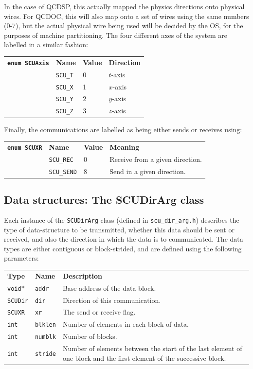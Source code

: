 \documentclass[12pt]{article}
\newcommand{\cde}[1]{{\tt #1}}            %
\begin{document}
In the case of QCDSP, this actually mapped the physics directions
onto physical wires.  For QCDOC, this will also map onto a set of
wires using the same numbers (0-7), but the actual physical wire being
used will be decided by the OS, for the purposes of machine
partitioning. The four different axes of the system are labelled in a
similar fashion:

\begin{tabular}{llll}
\cde{{\bf enum SCUAxis}} & {\bf Name} & {\bf Value} & {\bf Direction} \\
                        &\cde{SCU\_\-T} & 0 & $t$-axis\\
                        &\cde{SCU\_\-X} & 1 & $x$-axis\\
                        &\cde{SCU\_\-Y} & 2 & $y$-axis\\
                        &\cde{SCU\_\-Z} & 3 & $z$-axis
\end{tabular}

Finally, the communications are labelled as being either sends or receives using:

\begin{tabular}{llll}
\cde{{\bf enum SCUXR}} & {\bf Name} & {\bf Value} & {\bf Meaning} \\
                        &\cde{SCU\_\-REC}  & 0 & Receive from a given direction. \\
                        &\cde{SCU\_\-SEND} & 8 & Send in a given direction.
\end{tabular}

\subsection{Data structures: The SCUDirArg class}
\label{col:comm:data}
Each instance of the \cde{SCUDirArg} class (defined in
\cde{scu\_dir\_arg.h}) describes the type of data-structure to be
transmitted, whether this data should be sent or received, and also
the direction in which the data is to communicated.  The data types
are either contiguous or block-strided, and are defined using the
following parameters:

\begin{tabularx}{16cm}{llX}
{\bf Type}  & {\bf Name} & {\bf Description} \\
\cde{void$\ast$}  & \cde{addr}       & Base address of the data-block. \\
\cde{SCUDir}      & \cde{dir}        & Direction of this communication. \\
\cde{SCUXR}       & \cde{xr}         & The send or receive flag.\\
\cde{int}         & \cde{blklen}     & Number of elements in each block of data. \\
\cde{int}         & \cde{numblk}     & Number of blocks.\\
\cde{int}         & \cde{stride}     & Number of elements between the
start of the last element of one block and the first element of the successive block.
\end{tabularx}
\end{document}
